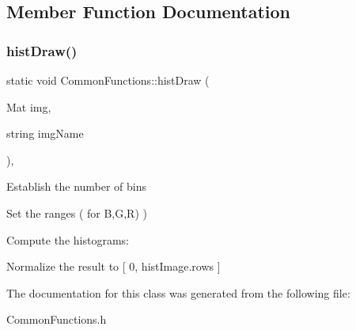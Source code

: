 \subsection{Member Function Documentation}
\mbox{\label{classCommonFunctions_a7b0e52ec4c30af5244724936f163c2d1}} 
\subsubsection{\texorpdfstring{hist\+Draw()}{histDraw()}}
{\footnotesize\ttfamily static void Common\+Functions\+::hist\+Draw (\begin{DoxyParamCaption}\item[{Mat}]{img,  }\item[{string}]{img\+Name }\end{DoxyParamCaption})\hspace{0.3cm}{\ttfamily [inline]}, {\ttfamily [static]}}

Establish the number of bins

Set the ranges ( for B,G,R) )

Compute the histograms\+:

Normalize the result to \mbox{[} 0, hist\+Image.\+rows \mbox{]} 

The documentation for this class was generated from the following file\+:\begin{DoxyCompactItemize}
\item 
Common\+Functions.\+h\end{DoxyCompactItemize}
